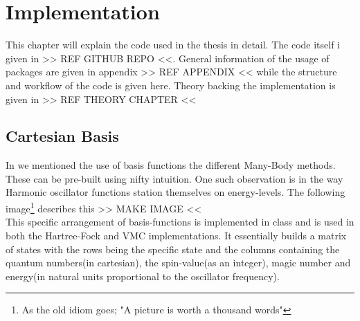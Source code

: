 \chapter{Implementation \label{chapter:6}}
    This chapter will explain the code used in the thesis in detail. The code
    itself i given in >> REF GITHUB REPO <<. General information of the usage
    of packages are given in appendix >> REF APPENDIX << while the structure
    and workflow of the code is given here. Theory backing the implementation
    is given in >> REF THEORY CHAPTER <<

\section{Cartesian Basis}
    In  we mentioned the use of basis functions the different
    Many-Body methods. These can be pre-built using nifty intuition. One such
    observation is in the way Harmonic oscillator functions station themselves
    on energy-levels. The following image\footnote{As the old idiom goes; "A
    picture is worth a thousand words"} describes this >> MAKE IMAGE << \\ This
    specific arrangement of basis-functions is implemented in class
     and is used in both the Hartree-Fock and VMC
    implementations. It essentially builds a matrix of states with the rows
    being the specific state and the columns containing the quantum numbers(in
    cartesian), the spin-value(as an integer), magic number and energy(in
    natural units proportional to the oscillator frequency).

